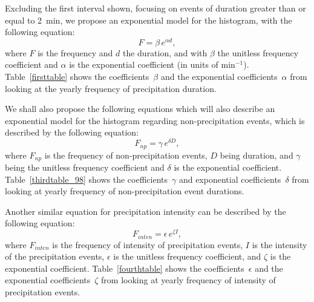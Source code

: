 \documentclass[11pt]{report}
\begin{document}
Excluding the first interval shown, focusing on events of duration
greater than or equal to 2~min, we propose an exponential model for
the histogram, with the following equation:
\begin{equation}\label{expod}
  F = \beta \,e^{\alpha d},
\end{equation}
where $F$ is the frequency and $d$ the duration, and with $\beta$ the
unitless frequency coefficient and $\alpha$ is the exponential coefficient
(in units of min$^{-1}$). Table~\ref{firsttable} shows the
coefficients~$\beta$ and the exponential coefficients~$\alpha$ from looking
at the yearly frequency of precipitation duration.

We shall also propose the following equations which will also describe an
exponential model for the histogram regarding non-precipitation events,
which is described by the following equation:
\begin{equation}\label{expod_np}
	F_{np} = \gamma \,e^{\delta D},
\end{equation}
where $F_{np}$ is the frequency of non-precipitation events, $D$ being
duration, and $\gamma $ being the unitless frequency coefficient and $\delta
$ is the exponential coefficient. Table~\ref{thirdtable_98} shows the
coefficients~$\gamma$ and exponential coefficients~$\delta$ from looking at
yearly frequency of non-precipitation event durations.

Another similar equation for precipitation intensity can be described by the
following equation:
\begin{equation}\label{expod_inten}
	F_{inten} = \epsilon \,e^{\zeta I},
\end{equation}
where $F_{inten}$ is the frequency of intensity of precipitation events, $I$
is the intensity of the precipitation events, $\epsilon$ is the unitless
frequency coefficient, and $\zeta$ is the exponential
coefficient. Table~\ref{fourthtable} shows the coefficients~$\epsilon$ and
the exponential coefficients~$\zeta$ from looking at yearly frequency of
intensity of precipitation events.
\end{document}
